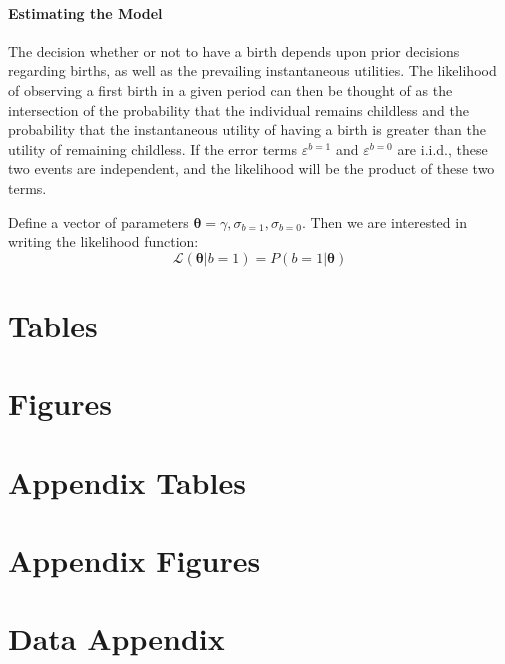 \documentclass[a4paper, 11 pt]{article}
\theoremstyle{plain}
\begin{document}
\begin{spacing}{1.2}
\paragraph{Estimating the Model}
The decision whether or not to have a birth depends upon prior decisions 
regarding births, as well as the prevailing instantaneous utilities.  The
likelihood of observing a first birth in a given period can then be thought of
as the intersection of the probability that the individual remains childless and
the probability that the instantaneous utility of having a birth is greater than
the utility of remaining childless.  If the error terms $\varepsilon^{b=1}$
and $\varepsilon^{b=0}$ are i.i.d., these two events are independent, and the
likelihood will be the product of these two terms.

Define a vector of parameters $\bm\theta=\gamma,\sigma_{b=1},\sigma_{b=0}$.  
Then we are interested in writing the likelihood function:
\[
\mathcal{L}(\bm\theta|b=1)=P(b=1|\bm\theta)
\]

\newpage

\newpage
\section*{Tables}


\newpage
\section*{Figures}


\clearpage
\appendix
\section{Appendix Tables}


\clearpage
\appendix
\section{Appendix Figures}



\section{Data Appendix}
\label{bqScn:datApp}

\end{spacing}
\end{document}
